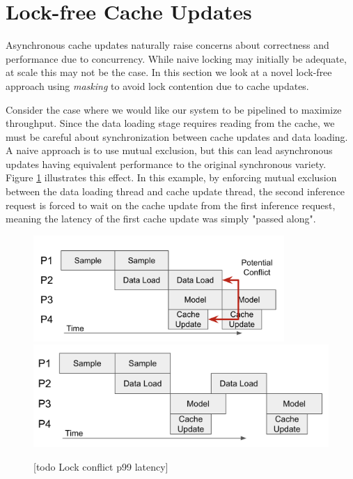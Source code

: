 \section{Lock-free Cache Updates} \label{Design: Lock-free}
Asynchronous cache updates naturally raise concerns about correctness and performance due to concurrency. While naive locking may initially be adequate, at scale this may not be the case. In this section we look at a novel lock-free approach using \textit{masking} to avoid lock contention due to cache updates.


Consider the case where we would like our system to be pipelined to maximize throughput. Since the data loading stage requires reading from the cache, we must be careful about synchronization between cache updates and data loading. 
A naive approach is to use mutual exclusion, but this can lead asynchronous updates having equivalent performance to the original synchronous variety. Figure \ref{Impl: Contended pipeline} illustrates this effect. In this example, by enforcing mutual exclusion between the data loading thread and cache update thread, the second inference request is forced to wait on the cache update from the first inference request, meaning the latency of the first cache update was simply "passed along".

\begin{figure}[h!]
    \centering
    \includegraphics[width=0.85\textwidth]{figures/Pipeline no lock.png}
    \includegraphics[width=\textwidth]{figures/Pipeline with lock.png}
    \caption{[todo Lock conflict p99 latency]}
    \label{Impl: Contended pipeline}
\end{figure}    

